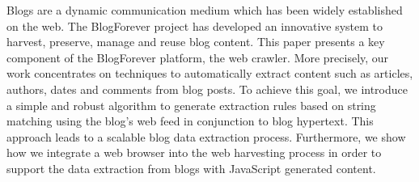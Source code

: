 Blogs are a dynamic communication medium which has been widely established on the web. The BlogForever project has developed an innovative system to harvest, preserve, manage and reuse blog content. This paper presents a key component of the BlogForever platform, the web crawler. More precisely, our work concentrates on techniques to automatically extract content such as articles, authors, dates and comments from blog posts. To achieve this goal, we introduce a simple and robust algorithm to generate extraction rules based on string matching using the blog's web feed in conjunction to blog hypertext. This approach leads to a scalable blog data extraction process. Furthermore, we show how we integrate a web browser into the web harvesting process in order to support the data extraction from blogs with JavaScript generated content.
